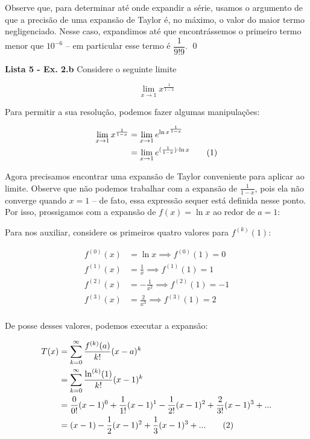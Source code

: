 \documentclass[12.5pt,reqno,a4paper]{amsart}
\newcommand\numberthis{\addtocounter{equation}{1}\tag{\theequation}}
\begin{document}
\bigskip
Observe que, para determinar até onde expandir a série, usamos o argumento de que a precisão de uma expansão de Taylor é, no máximo, o valor do maior termo negligenciado. Nesse caso, expandimos até que encontrássemos o primeiro termo menor que $10^{-6}$ – em particular esse termo é $\dfrac{1}{9! 9}$.
\qed\null

\newpage
\textbf{Lista 5 - Ex. 2.b}
\medbreak
Considere o seguinte limite

\begin{equation*}
    \lim_{x \to 1} x^\frac{1}{1 - x} 
\end{equation*}

\bigskip
Para permitir a sua resolução, podemos fazer algumas manipulações:

\bigskip
\begin{align*}
    \lim_{x \to 1} x^{\frac{1}{1 - x}}
        &= \lim_{x \to 1} e^{\ln{x^\frac{1}{1 - x}}}\\
        &= \lim_{x \to 1} e^{(\frac{1}{1 - x}) \cdot \ln{x}} \numberthis\label{2-lim_exp}\\
\end{align*}

\bigskip
\bigskip
Agora precisamos encontrar uma expansão de Taylor conveniente para aplicar ao limite. Observe que não podemos trabalhar com a expansão de $\frac{1}{1-x}$, pois ela não converge quando $x = 1$ – de fato, essa expressão sequer está definida nesse ponto. Por isso, prossigamos com a expansão de $f(x) = \ln x$ ao redor de $a = 1$:

\bigskip
\bigskip
Para nos auxiliar, considere os primeiros quatro valores para $f^{(k)}(1)$:

\bigskip
\begin{align*}
    f^{(0)} (x) &= \ln x \implies f^{(0)} (1) = 0 \\
    f^{(1)} (x) &= \frac{1}{x} \implies f^{(1)} (1) = 1 \\
    f^{(2)} (x) &= -\frac{1}{x^2} \implies f^{(2)} (1) = -1 \\
    f^{(3)} (x) &= \frac{2}{x^3} \implies f^{(3)} (1) = 2 \\
\end{align*}

\bigskip
\bigskip
De posse desses valores, podemos executar a expansão:

\begin{align*}
    T(x) &= \sum_{k=0}^\infty \frac{f^{(k)}(a)}{k!}(x-a)^k\\
         &= \sum_{k=0}^\infty \frac{\ln^{(k)}(1)}{k!}(x-1)^k\\
         &= \frac{0}{0!}(x-1)^0 + \frac{1}{1!}(x-1)^1 - \frac{1}{2!}(x-1)^2 + \frac{2}{3!}(x-1)^3 + ...\\
         &= (x-1) - \frac{1}{2}(x-1)^2 + \frac{1}{3}(x-1)^3 + ... \numberthis \label{2-ln_expansion}
\end{align*}
\end{document}
